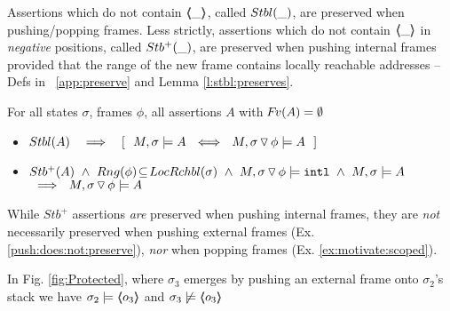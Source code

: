  

{Assertions} which do  not contain  $\langle\!\!\langle \_ \rangle\!\!\rangle$, called   ${Stbl( \_ )}$, are preserved when pushing/popping  frames.  
{Less strictly}, assertions which do  not contain $\langle\!\!\langle \_ \rangle\!\!\rangle$ in \emph{negative} positions, called ${Stb^+( \_ )}$,  are preserved when pushing  {internal} frames provided that the range of the new frame contains locally reachable addresses -- 
\cf  Defs   in \A\ \ref{app:preserve} and Lemma \ref{l:stbl:preserves}.

\begin{lemma}
For all  states $\sigma$, frames $\phi$,   all assertions $A$ with  ${\hspace{-1pt}F\hspace{-1pt}}v(A)=\emptyset $
\label{l:preserve:asrt}
\label{l:stbl:preserves} 
\begin{itemize}
\item 
$\Stable{A} \  \ \  \Longrightarrow  \  \ \  [\ \ M, \sigma \models A \ \ \Longleftrightarrow \ \  M,{\PushSLong \phi \sigma} \models A\ \ ]$
\item 
\label{l:preserve:asrt:two}
${Stb^+( A )}   \ \wedge    \ Rng(\phi)\!\subseteq\! LocRchbl(\sigma)\ \wedge\  M, { \sigma \, {\triangledown}\, \phi} \models  \mbox{\normalfont{\texttt{intl}}}\  \wedge  \ M, \sigma \models A $
$\  \ \Longrightarrow \  \ M,{ \sigma \, {\triangledown}\, \phi} \models A\ $
\end{itemize}
\end{lemma}


While $Stb^+$ assertions \emph{are} preserved  when pushing  internal frames,   they  are \emph{not} necessarily preserved when pushing  external frames   (\cf  Ex. \ref{push:does:not:preserve}), \emph{nor} when popping frames   (\cf Ex. \ref{ex:motivate:scoped}). 

 
\begin{example}
\label{push:does:not:preserve}
In    Fig. \ref{fig:Protected}, where $\sigma_3$ emerges by pushing an external frame onto $ \sigma_2$’s stack we have $\sigma_2 \models \langle\!\!\langle o_3 \rangle\!\!\rangle$ and $\sigma_3 \not\models \langle\!\!\langle o_3 \rangle\!\!\rangle$ 
\end{example}
 


